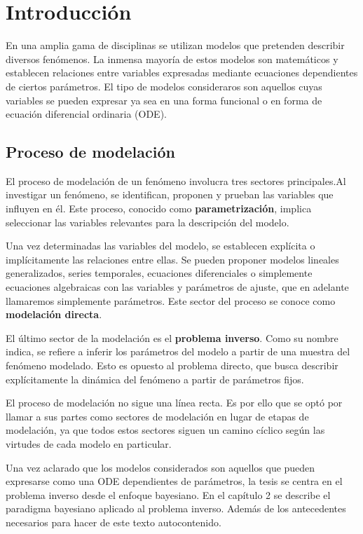 \chapter{Introducción}

En una amplia gama de disciplinas se utilizan modelos que pretenden describir diversos fenómenos. La inmensa mayoría de estos modelos son matemáticos y establecen relaciones entre variables expresadas mediante ecuaciones dependientes de ciertos parámetros. El tipo de modelos consideraros son aquellos cuyas variables se pueden expresar ya sea en una forma funcional o en forma de ecuación diferencial ordinaria (ODE).

\section*{Proceso de modelación}

El proceso de modelación de un fenómeno involucra tres sectores principales.Al investigar un fenómeno, se identifican, proponen y prueban las variables que influyen en él. Este proceso, conocido como \textbf{parametrización}, implica seleccionar las variables relevantes para la descripción del modelo.

Una vez determinadas las variables del modelo, se establecen explícita o implícitamente las relaciones entre ellas. Se pueden proponer modelos lineales generalizados, series temporales, ecuaciones diferenciales o simplemente ecuaciones algebraicas con las variables y parámetros de ajuste, que en adelante llamaremos simplemente parámetros. Este sector del proceso se conoce como \textbf{modelación directa}.

El último sector de la modelación es el \textbf{problema inverso}. Como su nombre indica, se refiere a inferir los parámetros del modelo a partir de una muestra del fenómeno modelado. Esto es opuesto al problema directo, que busca describir explícitamente la dinámica del fenómeno a partir de parámetros fijos. 

El proceso de modelación no sigue una línea recta. Es por ello que se optó por llamar a sus partes como sectores de modelación en lugar de etapas de modelación, ya que todos estos sectores siguen un camino cíclico según las virtudes de cada modelo en particular. 

Una vez aclarado que los modelos considerados son aquellos que pueden expresarse como una ODE dependientes de parámetros, la tesis se centra en el problema inverso desde el enfoque bayesiano. En el capítulo 2 se describe el paradigma bayesiano aplicado al problema inverso. Además de los antecedentes necesarios para hacer de este texto autocontenido. 

